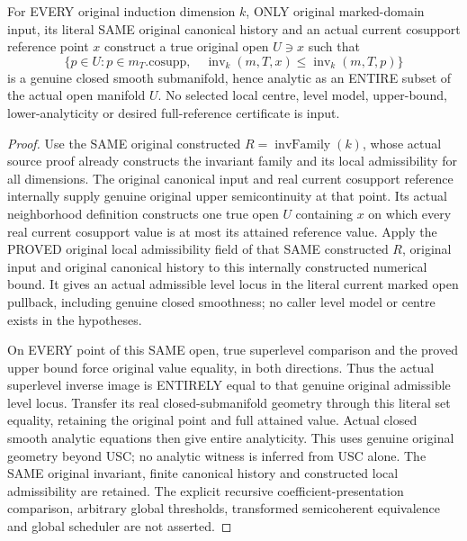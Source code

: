\begin{theorem}
\label{hir:original-all-depth-full-reference-value-analytic-presentation}
\leanok
{}
For EVERY original induction dimension $k$, ONLY original marked-domain input,
its literal SAME original canonical history and an actual current cosupport
reference point $x$ construct a true original open $U\ni x$ such that
\[
 \{p\in U:p\in m_T.\mathrm{cosupp},\quad
        \operatorname{inv}_k(m,T,x)\le\operatorname{inv}_k(m,T,p)\}
\]
is a genuine closed smooth submanifold, hence analytic as an ENTIRE subset
of the actual open manifold $U$. No selected local centre, level model,
upper-bound, lower-analyticity or desired full-reference certificate is input.
\end{theorem}
\begin{proof}
Use the SAME original constructed $R=\operatorname{invFamily}(k)$, whose actual
source proof already constructs the invariant family and its local
admissibility for all dimensions. The original canonical input and real
current cosupport reference internally supply genuine original upper
semicontinuity at that point. Its actual neighborhood definition constructs
one true open $U$ containing $x$ on which every real current cosupport value
is at most its attained reference value. Apply the PROVED original local
admissibility field of that SAME constructed $R$, original input and original
canonical history to this internally constructed numerical bound. It gives
an actual admissible level locus in the literal current marked open pullback,
including genuine closed smoothness; no caller level model or centre exists
in the hypotheses.

On EVERY point of this SAME open, true superlevel comparison and the proved
upper bound force original value equality, in both directions. Thus the
actual superlevel inverse image is ENTIRELY equal to that genuine original
admissible level locus. Transfer its real closed-submanifold geometry through
this literal set equality, retaining the original point and full attained
value. Actual closed smooth analytic equations then give entire analyticity.
This uses genuine original geometry beyond USC; no analytic witness is
inferred from USC alone. The SAME original invariant, finite canonical
history and constructed local admissibility are retained. The explicit
recursive coefficient-presentation comparison, arbitrary global thresholds,
transformed semicoherent equivalence and global scheduler are not asserted.
\end{proof}

